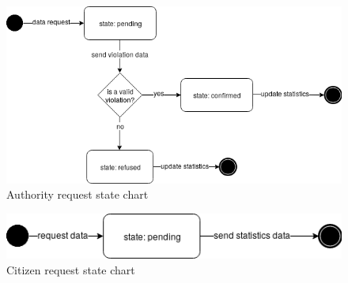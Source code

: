 \documentclass{article}
\begin{document}
\begin{figure}[h!]
    \centering
    \includegraphics[scale=0.5]{img/authority_request.png}
    \caption{Authority request state chart}
\end{figure}

\begin{figure}[h!]
    \centering
    \includegraphics[scale=0.5]{img/citizen_request.png}
    \caption{Citizen request state chart}
\end{figure}
\end{document}
